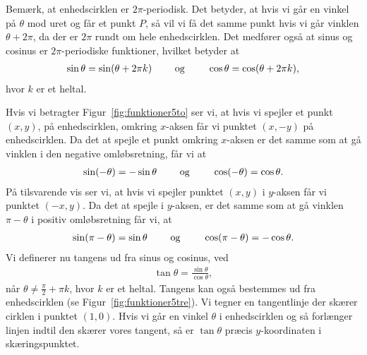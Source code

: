 Bemærk, at enhedscirklen er $2\pi$-periodisk. Det betyder, at hvis vi går en vinkel på $\theta$ mod uret og får et punkt $P$, så vil vi få det samme punkt hvis vi går vinklen $\theta+2\pi$, da der er $2\pi$ rundt om hele enhedscirklen. Det medfører også at sinus og cosinus er $2\pi$-periodiske funktioner, hvilket betyder at
\begin{align*}
\sin\theta = \sin(\theta + 2\pi k) \qquad \textup{ og } \qquad \cos\theta = \cos(\theta + 2\pi k),
\end{align*}
hvor $k$ er et heltal.

Hvis vi betragter Figur~\ref{fig:funktioner5to} ser vi, at hvis vi spejler et punkt $(x,y)$, på enhedscirklen, omkring $x$-aksen får vi punktet $(x,-y)$ på enhedscirklen. Da det at spejle et punkt omkring $x$-aksen er det samme som at gå vinklen i den negative omløbsretning, får vi at 
\begin{align*}
\sin(-\theta) = -\sin\theta \qquad \textup{ og } \qquad \cos(-\theta)=\cos\theta.
\end{align*}
På tilsvarende vis ser vi, at hvis vi spejler punktet $(x,y)$ i $y$-aksen får vi punktet $(-x,y)$. Da det at spejle i $y$-aksen, er det samme som at gå vinklen $\pi - \theta$ i positiv omløbsretning får vi, at
\begin{align*}
\sin(\pi - \theta)=\sin\theta \qquad \textup{ og } \qquad \cos(\pi - \theta) = - \cos\theta.
\end{align*} 
Vi definerer nu tangens ud fra sinus og cosinus, ved
\begin{align*}
\tan\theta=\frac{\sin\theta}{\cos\theta},
\end{align*}
når $\theta \neq \frac{\pi}{2} + \pi k$, hvor $k$ er et heltal. Tangens kan også bestemmes ud fra enhedscirklen (se Figur~\ref{fig:funktioner5tre}). Vi tegner en tangentlinje der skærer cirklen i punktet $(1,0)$. Hvis vi går en vinkel $\theta$ i enhedscirklen og så forlænger linjen indtil den skærer vores tangent, så er $\tan\theta$ præcis $y$-koordinaten i skæringspunktet. 
